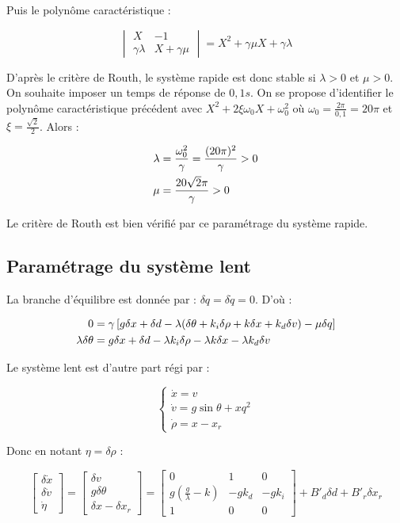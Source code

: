 \documentclass[10pt]{article}
\begin{document}
\noindent Puis le polynôme caractéristique :

\[
	\begin{vmatrix}
		X & -1 \\
		\gamma \lambda & X + \gamma \mu
	\end{vmatrix}
	= X^2 + \gamma \mu X + \gamma \lambda
\]

\noindent D'après le critère de Routh, le système rapide est donc stable si $\lambda > 0$ et $\mu > 0$. On souhaite
imposer un temps de réponse de $0,1 s$. On se propose d'identifier le polynôme caractéristique précédent avec
$X^2 + 2 \xi \omega_0 X + \omega_0^2$ où $\omega_0 = \frac{2 \pi}{0,1} = 20 \pi$ et $\xi = \frac{\sqrt 2}{2}$.
Alors :

\begin{align}
	\lambda &= \frac{\omega_0^2}{\gamma} = \frac{(20 \pi)^2}{\gamma} > 0 \notag \\
	\mu &= \frac{20 \sqrt 2 \pi}{\gamma} > 0 \notag
\end{align}

\noindent Le critère de Routh est bien vérifié par ce paramétrage du système rapide.

\subsection*{Paramétrage du système lent}

\noindent La branche d'équilibre est donnée par : $\delta q= \delta \dot q = 0$. D'où :

\begin{align}
	0 &= \gamma \left[ g \delta x + \delta d - \lambda ( \delta \theta + k_i \delta \rho + k \delta x + k_d \delta v )
	- \mu \delta q \right] \notag \\
	\lambda \delta \theta &= g \delta x + \delta d - \lambda k_i \delta \rho - \lambda k \delta x - \lambda k_d \delta v \notag 
\end{align}

\noindent Le système lent est d'autre part régi par :

\[
	 \begin{cases}
	 	\dot x = v \\
		\dot v = g \sin \theta + x q^2 \\
		\dot \rho = x - x_r
	\end{cases}
\]

\noindent Donc en notant $\eta = \delta \rho$ :

\[
	\begin{bmatrix}
		\delta \dot x \\
		\delta \dot v \\
		\dot \eta
	\end{bmatrix}
	= \begin{bmatrix}
		\delta v \\
		g \delta \theta \\
		\delta x - \delta x_r
	\end{bmatrix}
	= \begin{bmatrix}
		0 & 1 & 0 \\
		g ( \frac{g}{\lambda} - k ) & - g k_d & - g k_i \\
		1 & 0 & 0
	\end{bmatrix} +
	B'_d \delta d + B'_r \delta x_r
\]
\end{document}
